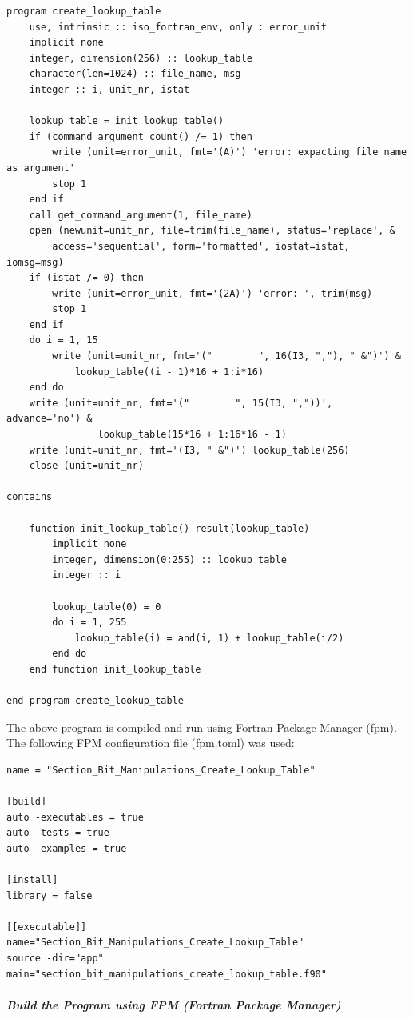\begin{verbatim}
program create_lookup_table
    use, intrinsic :: iso_fortran_env, only : error_unit
    implicit none
    integer, dimension(256) :: lookup_table
    character(len=1024) :: file_name, msg
    integer :: i, unit_nr, istat

    lookup_table = init_lookup_table()
    if (command_argument_count() /= 1) then
        write (unit=error_unit, fmt='(A)') 'error: expacting file name as argument'
        stop 1
    end if
    call get_command_argument(1, file_name)
    open (newunit=unit_nr, file=trim(file_name), status='replace', &
        access='sequential', form='formatted', iostat=istat, iomsg=msg)
    if (istat /= 0) then
        write (unit=error_unit, fmt='(2A)') 'error: ', trim(msg)
        stop 1
    end if
    do i = 1, 15
        write (unit=unit_nr, fmt='("        ", 16(I3, ","), " &")') &
            lookup_table((i - 1)*16 + 1:i*16) 
    end do
    write (unit=unit_nr, fmt='("        ", 15(I3, ","))', advance='no') &
                lookup_table(15*16 + 1:16*16 - 1) 
    write (unit=unit_nr, fmt='(I3, " &")') lookup_table(256)
    close (unit=unit_nr)

contains

    function init_lookup_table() result(lookup_table)
        implicit none
        integer, dimension(0:255) :: lookup_table
        integer :: i

        lookup_table(0) = 0
        do i = 1, 255
            lookup_table(i) = and(i, 1) + lookup_table(i/2)
        end do
    end function init_lookup_table

end program create_lookup_table
\end{verbatim}

The above program is compiled and run using Fortran Package Manager (fpm).  The following FPM configuration file (fpm.toml) was used:

\begin{verbatim}
name = "Section_Bit_Manipulations_Create_Lookup_Table"

[build]
auto -executables = true
auto -tests = true
auto -examples = true

[install]
library = false

[[executable]]
name="Section_Bit_Manipulations_Create_Lookup_Table"
source -dir="app"
main="section_bit_manipulations_create_lookup_table.f90"
\end{verbatim}

\subparagraph{Build the Program using FPM (Fortran Package Manager)}

